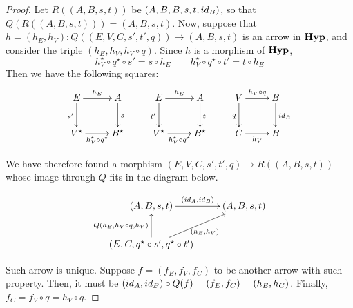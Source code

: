 \begin{proof}
	Let $R((A, B, s, t))$ be $(A, B, B, s, t, \id{B})$, so that $Q(R((A, B, s, t))) = (A, B, s, t)$. Now, suppose that $h = (h_E, h_V): Q((E, V, C, s', t', q)) \to (A, B, s, t)$  is an arrow in $\textbf{\textup{Hyp}}$, and consider the triple $(h_E, h_V, h_V \circ q)$. Since $h$ is a morphism of $\textbf{\textup{Hyp}}$, 
    \[h_V^{\star}\circ q^{\star}\circ s'= s\circ h_E \qquad  h_V^{\star}\circ q^{\star}\circ t' = t\circ h_E\]
    Then we have the following squares:
    \[\xymatrix{
		    E \ar[r]^{h_E}\ar[d]_{s'} & A \ar[d]^{s} & E \ar[r]^{h_E}\ar[d]_{t'} & A \ar[d]^{t} & V \ar[r]^{h_V \circ q} \ar[d]_{q} & B \ar[d]^{\id{B}} \\
		    V^{\star} \ar[r]_{h_V^\star\circ q^\star} & B^{\star} & V^{\star} \ar[r]_{h_V^\star\circ q^\star} & B^{\star} & C \ar[r]_{h_V} & B
    }\]

    \iffalse\[
        \begin{tikzcd}
            E \arrow[r, "{h_E}"] \arrow[d, "{s_G}"swap] & A \arrow[d, "s"] \\
            V \arrow[r, "{h_V \circ q}"swap] & B
        \end{tikzcd}
        \qquad
        \begin{tikzcd}
            E \arrow[r, "{h_E}"] \arrow[d, "{t_G}"swap] & A \arrow[d, "t"] \\
            V \arrow[r, "{h_V \circ q}"swap] & B
        \end{tikzcd}
        \qquad
        \begin{tikzcd}
            V \arrow[r, "{h_V\circ q}"] \arrow[d, "q" swap] & B \arrow[d, "{id_B}"] \\
            C \arrow[r, "{h_V}"swap] & B
        \end{tikzcd}
    \]\fi

    We have therefore found a morphism $(E, V, C, s', t', q) \to R((A, B, s, t))$ whose image through $Q$ fits in the diagram below.

    \[\xymatrix{
		    (A, B, s, t) \ar[r]^{(\id{A}, \id{B})} & (A, B, s, t)\\
		    (E, C, q^\star\circ s', q^\star\circ t') \ar[u]^{Q(h_E, h_V \circ q, h_V)} \ar[ur]_{(h_E, h_V)}
    }\]
   
    Such arrow is unique. Suppose $f = (f_E, f_V, f_C)$ to be another arrow with such property.
    Then, it must be $(\id A, \id B) \circ Q(f) = (f_E, f_C) = (h_E, h_C)$. Finally, $f_C = f_V \circ q = h_V \circ q$. 
\end{proof}

